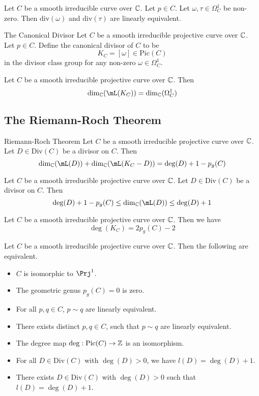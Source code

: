 \documentclass[a4paper]{article}
\begin{document}
\begin{prp}{}{} Let $C$ be a smooth irreducible curve over $\mathbb{C}$. Let $p\in C$. Let $\omega,\tau\in\Omega_C^1$ be non-zero. Then $\text{div}(\omega)$ and $\text{div}(\tau)$ are linearly equivalent. 
\end{prp}

\begin{defn}{The Canonical Divisor}{} Let $C$ be a smooth irreducible projective curve over $\mathbb{C}$. Let $p\in C$. Define the canonical divisor of $C$ to be $$K_C=[\omega]\in\text{Pic}(C)$$ in the divisor class group for any non-zero $\omega\in\Omega_C^1$. 
\end{defn}

\begin{lmm}{}{} Let $C$ be a smooth irreducible projective curve over $\mathbb{C}$. Then $$\dim_\C(\mL(K_C))=\dim_\C(\Omega_C^1)$$
\end{lmm}

\subsection{The Riemann-Roch Theorem}
\begin{thm}{Riemann-Roch Theorem}{} Let $C$ be a smooth irreducible projective curve over $\mathbb{C}$. Let $D\in\text{Div}(C)$ be a divisor on $C$. Then $$\dim_\C(\mL(D))+\dim_\C(\mL(K_C-D))=\deg(D)+1-p_g(C)$$
\end{thm}

\begin{prp}{}{} Let $C$ be a smooth irreducible projective curve over $\mathbb{C}$. Let $D\in\text{Div}(C)$ be a divisor on $C$. Then $$\deg(D)+1-p_g(C)\leq\dim_\C(\mL(D))\leq\deg(D)+1$$
\end{prp}

\begin{prp}{}{} Let $C$ be a smooth irreducible projective curve over $\mathbb{C}$. Then we have $$\deg(K_C)=2p_g(C)-2$$
\end{prp}

\begin{prp}{}{} Let $C$ be a smooth irreducible projective curve over $\mathbb{C}$. Then the following are equivalent. 
\begin{itemize}
\item $C$ is isomorphic to $\Prj^1$. 
\item The geometric genus $p_g(C)=0$ is zero. 
\item For all $p,q\in C$, $p\sim q$ are linearly equivalent. 
\item There exists distinct $p,q\in C$, such that $p\sim q$ are linearly equivalent. 
\item The degree map $\deg:\text{Pic}(C)\to\mathbb{Z}$ is an isomorphism. 
\item For all $D\in\text{Div}(C)$ with $\deg(D)>0$, we have $l(D)=\deg(D)+1$. 
\item There exists $D\in\text{Div}(C)$ with $\deg(D)>0$ such that $l(D)=\deg(D)+1$. 
\end{itemize}
\end{prp}
\end{document}
